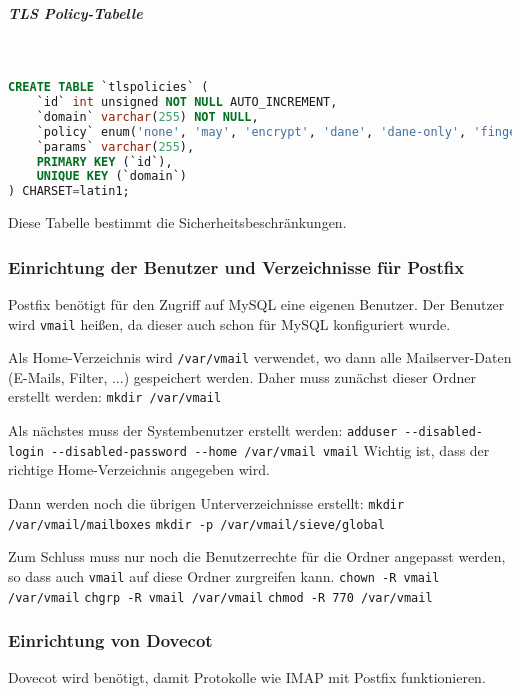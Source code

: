 \subparagraph{TLS Policy-Tabelle}\mbox{}\\
\begin{lstlisting}[language=SQL, caption=vmail - Alias-Tabelle]
CREATE TABLE `tlspolicies` (
	`id` int unsigned NOT NULL AUTO_INCREMENT,
	`domain` varchar(255) NOT NULL,
	`policy` enum('none', 'may', 'encrypt', 'dane', 'dane-only', 'fingerprint', 'verify', 'secure') NOT NULL,
	`params` varchar(255),
	PRIMARY KEY (`id`),
	UNIQUE KEY (`domain`)
) CHARSET=latin1;
\end{lstlisting}
Diese Tabelle bestimmt die Sicherheitsbeschränkungen.

\subsubsection{Einrichtung der Benutzer und Verzeichnisse für Postfix}
Postfix benötigt für den Zugriff auf MySQL eine eigenen Benutzer. Der Benutzer wird \verb|vmail| heißen, da dieser auch schon für MySQL konfiguriert wurde.

Als Home-Verzeichnis wird \verb|/var/vmail| verwendet, wo dann alle Mailserver-Daten (E-Mails, Filter, ...) gespeichert werden. Daher muss zunächst dieser Ordner erstellt werden:\newline
\verb|mkdir /var/vmail|\newline

Als nächstes muss der Systembenutzer erstellt werden:\newline
\verb|adduser --disabled-login --disabled-password --home /var/vmail vmail|\newline
Wichtig ist, dass der richtige Home-Verzeichnis angegeben wird.

Dann werden noch die übrigen Unterverzeichnisse erstellt:\newline
\verb|mkdir /var/vmail/mailboxes|\newline
\verb|mkdir -p /var/vmail/sieve/global|\newline

Zum Schluss muss nur noch die Benutzerrechte für die Ordner angepasst werden, so dass auch \verb|vmail| auf diese Ordner zurgreifen kann.\newline
\verb|chown -R vmail /var/vmail|\newline
\verb|chgrp -R vmail /var/vmail|\newline
\verb|chmod -R 770 /var/vmail|\newline


\subsubsection{Einrichtung von Dovecot}
Dovecot wird benötigt, damit Protokolle wie IMAP mit Postfix funktionieren.

